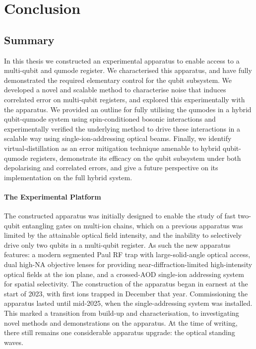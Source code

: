 \chapter{Conclusion}
\label{ch:conclusion}
\section{Summary}

    In this thesis we constructed an experimental apparatus to enable access to
    a multi-qubit and qumode register. We characterised this apparatus, and have
    fully demonstrated the required elementary control for the qubit subsystem.
    We developed a novel and scalable method to characterise noise that induces correlated error on multi-qubit registers,
    and explored this experimentally with the apparatus. We provided an outline
    for fully utilising the qumodes in a hybrid qubit-qumode system using
    spin-conditioned bosonic interactions and experimentally verified the
    underlying method to drive these interactions in a scalable way using
    single-ion-addressing optical beams. Finally, we identify
    virtual-distillation as an error mitigation technique amenable to hybrid
    qubit-qumode registers, demonstrate its efficacy on the qubit subsystem
    under both depolarising and correlated errors, and give a future perspective
    on its implementation on the full hybrid system.


\subsubsection{The Experimental Platform}
The constructed apparatus was initially designed to enable the study of fast two-qubit entangling gates on multi-ion chains, which on a previous apparatus was limited by the attainable optical field intensity, and the inability to selectively drive only two qubits in a multi-qubit register. As such the new apparatus features: a modern segmented Paul RF trap with large-solid-angle optical access, dual high-NA objective lenses for providing near-diffraction-limited high-intensity optical fields at the ion plane, and a crossed-AOD single-ion addressing system for spatial selectivity. 
The construction of the apparatus began in earnest at the start of 2023, with first ions trapped in December that year. Commissioning the apparatus lasted until mid-2025, when the single-addressing system was installed. This marked a transition from build-up and characterisation, to investigating novel methods and demonstrations on the apparatus. At the time of writing, there still remains one considerable apparatus upgrade: the optical standing waves.

